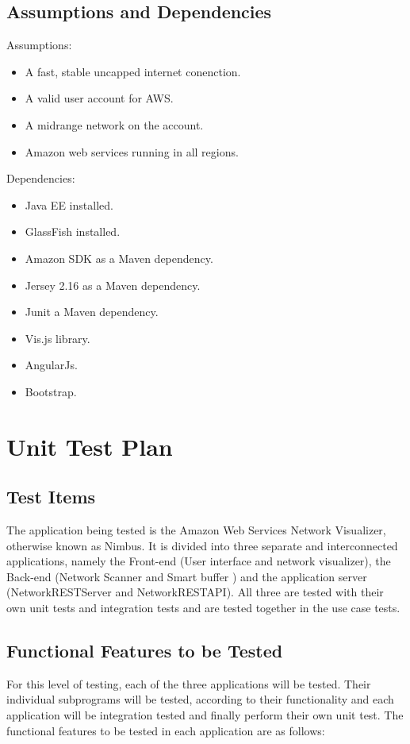 \documentclass[hidelinks,a4paper,12pt]{article}
\begin{document}
\subsection{Assumptions and Dependencies}
Assumptions:
\begin{itemize}
  \item A fast, stable uncapped internet conenction.
  \item A valid user account for AWS.
	\item A midrange network on the account.
	\item Amazon web services running in all regions.
\end{itemize}
Dependencies:
\begin{itemize}
  \item Java EE installed.
  \item GlassFish installed.
\item Amazon SDK as a Maven dependency.
\item Jersey 2.16 as a Maven dependency.
\item Junit a Maven dependency.
\item Vis.js library.
\item AngularJs.
\item Bootstrap.
\end{itemize}
\newpage
\section{Unit Test Plan}

\subsection{Test Items}
The application being tested is the Amazon Web Services Network Visualizer, otherwise known as Nimbus. It is divided into three separate and interconnected applications, namely the Front-end (User interface and network visualizer), the Back-end (Network Scanner and Smart buffer ) and the application server (NetworkRESTServer and NetworkRESTAPI). All three are tested with their own unit tests and integration tests and are tested together in the use case tests.
 
\subsection{Functional Features to be Tested}  
For this level of testing, each of the three applications will be tested. Their individual subprograms will be tested, according to their functionality and each application will be integration tested and finally perform their own unit test. The functional features to be tested in each application are as follows:
\end{document}
